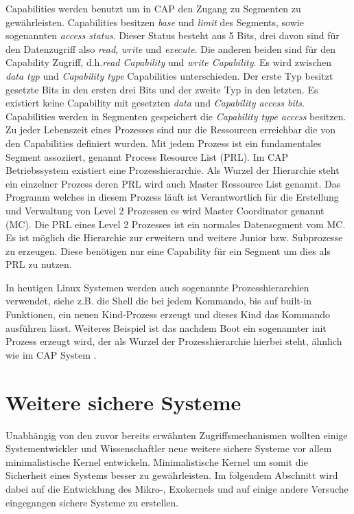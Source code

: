 \documentclass[11pt,technote]{IEEEtran}
\begin{document}
		     Capabilities werden benutzt um in CAP den Zugang zu Segmenten zu gew\"ahrleisten.
		     Capabilities besitzen \textit{base} und \textit{limit} des Segments, sowie sogenannten \textit{access status}. Dieser Status
		     besteht aus 5 Bits, drei davon sind f\"ur den Datenzugriff also \textit{read}, \textit{write} und \textit{execute}.
		     Die anderen beiden sind f\"ur den Capability Zugriff, d.h.\textit{read Capability} und \textit{write Capability}.
		     Es wird zwischen \textit{data typ} und \textit{Capability type} Capabilities unterschieden. Der erste Typ besitzt gesetzte Bits in den ersten drei Bits 
		     und der zweite Typ in den letzten. Es existiert keine Capability mit gesetzten \textit{data} und \textit{Capability access bits}.
		     Capabilities werden in Segmenten gespeichert die \textit{Capability type access} besitzen.
		     Zu jeder Lebenszeit eines Prozesses sind nur die Ressourcen erreichbar die von den Capabilities definiert wurden.
		     Mit jedem Prozess ist ein fundamentales Segment assoziiert, genannt Process Resource List (PRL). 
		     Im CAP Betriebssystem existiert eine Prozesshierarchie. Als Wurzel der Hierarchie steht ein einzelner Prozess deren PRL wird auch Master Ressource List 
		     genannt. Das Programm welches in diesem Prozess l\"auft ist Verantwortlich f\"ur die Erstellung und Verwaltung von Level 2 
		     Prozessen es wird Master Coordinator genannt (MC).
		     Die PRL eines Level 2 Prozesses ist ein normales Datensegment vom MC. Es ist m\"oglich die Hierarchie zur erweitern und weitere Junior
		     bzw. Subprozesse zu erzeugen. Diese ben\"otigen nur eine Capability f\"ur ein Segment um dies als PRL zu nutzen.
		     
		     In heutigen Linux Systemen werden auch sogenannte Prozesshierarchien verwendet, siehe z.B. die Shell die bei jedem
		     Kommando, bis auf built-in Funktionen, ein neuen Kind-Prozess erzeugt und dieses Kind das Kommando ausf\"uhren l\"asst. Weiteres Beispiel
		     ist das nachdem Boot ein sogenannter init Prozess erzeugt wird, der als Wurzel der Prozesshierarchie hierbei steht, \"ahnlich wie 
		     im CAP System \cite{Url:linux:processes}.
		     
  \section{Weitere sichere Systeme} \label{sec:other}
    Unabh\"angig von den zuvor bereits erw\"ahnten Zugriffsmechanismen wollten einige Systementwickler und Wissenschaftler neue weitere sichere Systeme
    vor allem minimalistische Kernel entwickeln. Minimalistische Kernel um somit die Sicherheit eines Systems besser zu gew\"ahrleisten.
    Im folgendem Abschnitt wird dabei auf die Entwicklung des Mikro-, Exokernels und auf einige andere Versuche eingegangen sichere Systeme zu erstellen.
\end{document}
